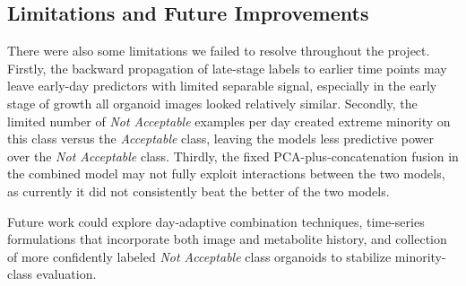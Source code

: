 \documentclass{article}
\begin{document}
\subsection{Limitations and Future Improvements}

There were also some limitations we failed to resolve throughout the project. Firstly, the backward propagation of late-stage labels to earlier time points may leave early-day predictors with limited separable signal, especially in the early stage of growth all organoid images looked relatively similar. Secondly, the limited number of \textit{Not Acceptable} examples per day created extreme minority on this class versus the \textit{Acceptable} class, leaving the models less predictive power over the \textit{Not Acceptable} class. Thirdly, the fixed PCA-plus-concatenation fusion in the combined model may not fully exploit interactions between the two models, as currently it did not consistently beat the better of the two models. 

Future work could explore day-adaptive combination techniques, time-series formulations that incorporate both image and metabolite history, and collection of more confidently labeled \textit{Not Acceptable} class organoids to stabilize minority-class evaluation.




\end{document}
